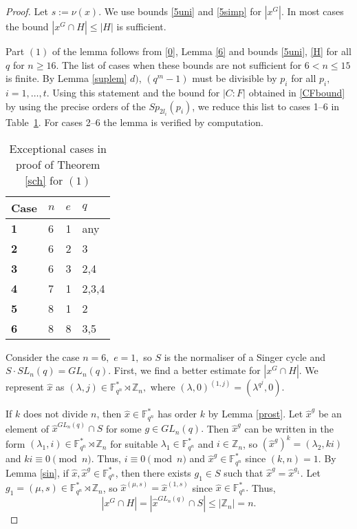 \begin{proof}
Let $s:=\nu(x).$ We use bounds  \eqref{5uni} and \eqref{5simp} for $|x^G|.$
In most cases the bound $|x^G \cap H| \le |H|$ is sufficient. 

Part $(1)$ of the lemma follows from \eqref{0}, Lemma \ref{6} and bounds  \eqref{5uni}, \eqref{H} for all $q$ for $n \ge 16$. The list of cases when these bounds  are not sufficient for $6 <n \le 15$ is finite. By  Lemma \ref{suplem} $d)$,   $(q^m-1)$ must be divisible by $p_i$ for all $p_i,$ $i=1, \ldots, t.$ Using this statement and the bound for $|C:F|$ obtained in \eqref{CFbound} by using the precise orders of the $Sp_{2l_i}(p_i)$, we reduce this list to  cases 1--6 in Table~\ref{tab}. %
  For cases 2--6 the lemma is verified by computation. 
\begin{table}[h]
\centering
\caption{Exceptional cases in proof of Theorem \ref{sch} for $(1)$}
\label{tab}
\begin{tabular}{|l|l|l|l|}
\hline
\textbf{Case} & $n$ & $e$ & $q$   \\ \hline
\textbf{1}  & 6   & 1   & any   \\ \hline
\textbf{2}  & 6   & 2   & 3     \\ \hline
\textbf{3}  & 6   & 3   & 2,4 \\ \hline
\textbf{4}  & 7   & 1   & 2,3,4 \\ \hline
\textbf{5}  & 8   & 1   & 2     \\ \hline
\textbf{6}  & 8   & 8   & 3,5    \\ \hline
\end{tabular}
\end{table} 

 Consider the case $n=6,$ $e=1,$ so $S$ is the normaliser of a Singer cycle and $S \cdot SL_n(q)=GL_n(q).$ First, we find a better 	
estimate for $|x^G \cap {H}|. $ We  represent $\hat{x}$ as $(\lambda, j) \in \mathbb{F}_{q^n}^{*} \rtimes \mathbb{Z}_n,$
where $(\lambda, 0)^{(1, j)}=(\lambda^{q^j},0).$

If $k$ does not divide $n$, then $\hat{x} \in \mathbb{F}_{q^n}^*$ has order $k$ by Lemma \ref{prost}. Let $\hat{x}^g$  be an element of $\hat{x}^{GL_n(q)} \cap S$ for some $g \in GL_n(q).$
Then $\hat{x}^g$ can be written in the form $(\lambda_1, i) \in \mathbb{F}_{q^n}^{*}\rtimes \mathbb{Z}_n$ for suitable $\lambda_1 \in \mathbb{F}_{q^n}^*$ and $i \in \mathbb{Z}_n$, so $(\hat{x}^g)^k=(\lambda_2, ki)$ and $ki \equiv 0 \pmod{n}$. Thus, $i\equiv 0 \pmod{n}$ and $\hat{x}^g \in \mathbb{F}_{q^n}^*$ since $(k,n)=1$. %
By  Lemma \ref{sin},  if $\hat{x}, \hat{x}^g \in \mathbb{F}_{q^n}^*$, then there exists $g_1 \in S$ such
that $\hat{x}^g=\hat{x}^{g_1}.$ Let $g_1 =(\mu,s ) \in \mathbb{F}_{q^n}^{*}\rtimes \mathbb{Z}_n$, so $\hat{x}^{(\mu, s)}= \hat{x}^{(1,s)}$ since $\hat{x} \in \mathbb{F}_{q^n}^{*}.$ Thus, 
\begin{equation}\label{8}
|x^G \cap H| = |\hat{x}^{GL_n(q)} \cap S|\le |\mathbb{Z}_n|=n.
\end{equation}



\end{proof}
